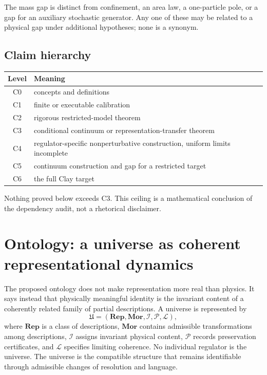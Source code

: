 \documentclass[11pt]{article}
\theoremstyle{remark}
\begin{document}
The mass gap is distinct from confinement, an area law, a one-particle pole,
or a gap for an auxiliary stochastic generator.  Any one of these may be
related to a physical gap under additional hypotheses; none is a synonym.

\subsection{Claim hierarchy}

\begin{center}
\begin{tabular}{cl}
\toprule
Level & Meaning\\
\midrule
C0 & concepts and definitions\\
C1 & finite or executable calibration\\
C2 & rigorous restricted-model theorem\\
C3 & conditional continuum or representation-transfer theorem\\
C4 & regulator-specific nonperturbative construction, uniform limits incomplete\\
C5 & continuum construction and gap for a restricted target\\
C6 & the full Clay target\\
\bottomrule
\end{tabular}
\end{center}

Nothing proved below exceeds C3.  This ceiling is a mathematical conclusion of
the dependency audit, not a rhetorical disclaimer.

\section{Ontology: a universe as coherent representational dynamics}

The proposed ontology does not make representation more real than physics.
It says instead that physically meaningful identity is the invariant content
of a coherently related family of partial descriptions.  A universe is
represented by
\[
 \mathfrak U=(\mathbf{Rep},\mathbf{Mor},\mathcal I,\mathcal P,\mathcal L),
\]
where $\mathbf{Rep}$ is a class of descriptions, $\mathbf{Mor}$ contains
admissible transformations among descriptions, $\mathcal I$ assigns invariant
physical content, $\mathcal P$ records preservation certificates, and
$\mathcal L$ specifies limiting coherence.  No individual regulator is the
universe.  The universe is the compatible structure that remains identifiable
through admissible changes of resolution and language.
\end{document}
